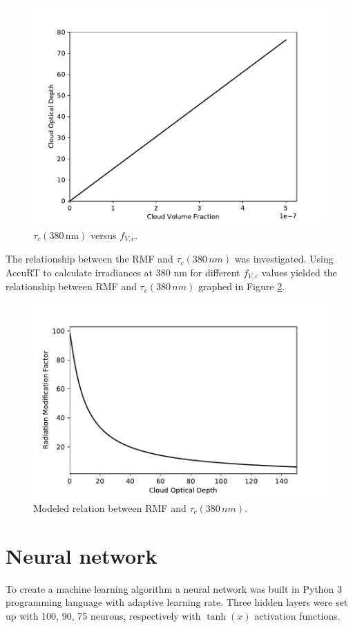 \documentclass{optica-article}
\begin{document}
\begin{figure}[H]
	\centering
	\includegraphics[width=0.7\linewidth]{COD_VS_Volf}
	\caption{$\tau_c{\scriptstyle(380 \, \text{nm})}$ versus $f_{V,c}$.}
	\label{fig:codvsvolf}
\end{figure}


The relationship between the RMF and $\tau_c{\scriptstyle(380 \, nm)}$ was investigated. 
Using AccuRT to calculate irradiances at 380 nm for different $f_{V,c}$ values yielded the relationship between RMF and $\tau_c{\scriptstyle(380 \, nm)}$ graphed in Figure \ref{fig:rmfvscod380}.

\begin{figure}[H]
	\centering
	\includegraphics[width=0.7\linewidth]{RMF_vs_COD_380}
	\caption{Modeled relation between RMF and $\tau_c{\scriptstyle(380 \, nm)}$.}
	\label{fig:rmfvscod380}
\end{figure}



\section{Neural network}
\label{sec-nn}

To create a machine learning algorithm a neural network was built in Python 3 programming language with adaptive learning rate.
Three hidden layers were set up with 100, 90, 75 neurons, respectively with $\tanh(x)$ activation functions.
\end{document}

